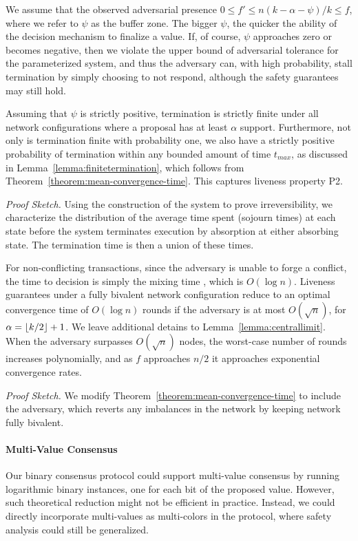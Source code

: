 \documentclass[letterpaper,twocolumn,10pt]{article}
\DeclarePairedDelimiter{\floor}{\lfloor}{\rfloor}
\newcommand{\Oh}[1]{O(#1)}
\theoremstyle{definition}
\begin{document}
We assume that the observed adversarial presence $0 \leq f' \leq n(k - \alpha - \psi)/k \leq f$, where we refer to $\psi$ as the buffer zone. 
The bigger $\psi$, the quicker the ability of the decision mechanism to finalize a value. 
If, of course, $\psi$ approaches zero or becomes negative, then we violate the upper bound of adversarial tolerance for the parameterized system, and thus the adversary can, with high probability, stall termination by simply choosing to not respond, although the safety guarantees may still hold. 

Assuming that $\psi$ is strictly positive, termination is strictly finite under all network configurations where a proposal has at least $\alpha$ support. Furthermore, not only is termination finite with probability one, we also have a strictly positive probability of termination within any bounded amount of time $t_{max}$, as discussed in Lemma~\ref{lemma:finitetermination}, which follows from Theorem~\ref{theorem:mean-convergence-time}. This captures liveness property P2. 

\noindent\emph{Proof Sketch.} Using the construction of the system to prove irreversibility, we characterize the distribution of the average time spent (sojourn times) at each state before the system terminates execution by absorption at either absorbing state. The termination time is then a union of these times. 

For non-conflicting transactions, since the adversary is unable to forge a conflict, the time to decision is simply the mixing time , which is $\Oh{\log{n}}$.
Liveness guarantees under a fully bivalent network configuration reduce to an optimal convergence time of $\Oh{\log{n}}$ rounds if the adversary is at most $\Oh{\sqrt{n}}$, for $\alpha = \floor{k/2} + 1$. We leave additional detains to Lemma~\ref{lemma:centrallimit}.
When the adversary surpasses $\Oh{\sqrt{n}}$ nodes, the worst-case number of rounds increases polynomially, and as $f$ approaches $n/2$ it approaches exponential convergence rates.

\noindent\emph{Proof Sketch.} We modify Theorem~\ref{theorem:mean-convergence-time} to include the adversary, which reverts any imbalances in the network by keeping network fully bivalent. 

\paragraph{Multi-Value Consensus}
Our binary consensus protocol could support multi-value consensus by running logarithmic binary instances, one for each bit of the proposed value. However, such theoretical reduction might not be efficient in practice. Instead, we could directly incorporate multi-values as multi-colors in the protocol, where safety analysis could still be generalized.
\end{document}
